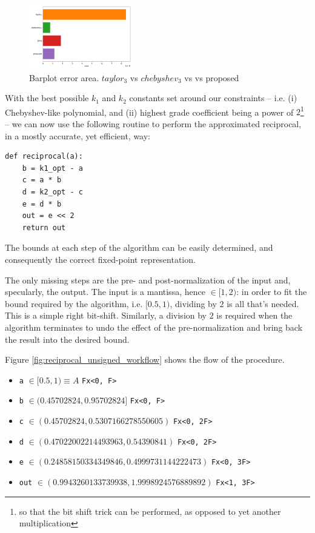 \begin{figure}
    \begin{center}
    \includegraphics[width=0.4\textwidth]{figures/barplot_area_error.pdf}
    \caption{Barplot error area. $taylor_3$ vs $chebyshev_3$ vs \cite{drom} vs proposed}
    \label{fig:are_barplot}
    \end{center}
\end{figure}


With the best possible $k_1$ and $k_2$ constants set around our constraints -- i.e. (i) Chebyshev-like polynomial, and (ii) highest grade coefficient being a power of $2$\footnote{so that the bit shift trick can be performed, as opposed to yet another multiplication} -- we can now use the following routine to perform the approximated reciprocal, in a mostly accurate, yet efficient, way:

\begin{lstlisting}[label=alg:reciprocal_approx_modified_drom]
def reciprocal(a):
    b = k1_opt - a
    c = a * b
    d = k2_opt - c
    e = d * b
    out = e << 2
    return out
\end{lstlisting}

The bounds at each step of the algorithm can be easily determined, and consequently the correct fixed-point representation.

The only missing steps are the pre- and post-normalization of the input and, specularly, the output.
The input is a mantissa, hence $\in [1, 2)$: in order to fit the bound required by the algorithm, i.e. $[0.5, 1)$, dividing by $2$ is all that's needed. This is a simple right bit-shift. Similarly, a division by $2$ is required when the algorithm terminates to undo the effect of the pre-normalization and bring back the result into the desired bound.


Figure \ref{fig:reciprocal_unsigned_workflow} shows the flow of the procedure. 



\begin{itemize}
    \item \texttt{a} $\in [0.5, 1) \equiv A $ \dotfill \texttt{Fx<0, F>}
    \item \texttt{b} $\in (0.45702824, 0.95702824] $ \dotfill \texttt{Fx<0, F>}
    \item \texttt{c} $\in (0.45702824, 0.5307166278550605) $ \dotfill \texttt{Fx<0, 2F>}
    \item \texttt{d} $\in (0.47022002214493963, 0.54390841) $ \dotfill \texttt{Fx<0, 2F>}
    \item \texttt{e} $\in (0.24858150334349846, 0.4999731144222473) $ \dotfill \texttt{Fx<0, 3F>}
    \item \texttt{out} $\in (0.9943260133739938, 1.9998924576889892) $ \dotfill \texttt{Fx<1, 3F>}
\end{itemize}



